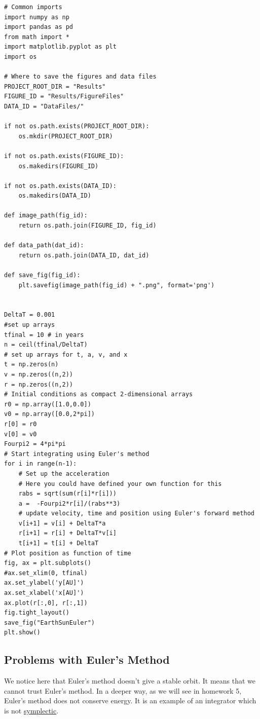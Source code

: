 \documentclass[%
oneside,                 %
final,                   %
10pt]{article}
\begin{document}
\begin{verbatim}
# Common imports
import numpy as np
import pandas as pd
from math import *
import matplotlib.pyplot as plt
import os

# Where to save the figures and data files
PROJECT_ROOT_DIR = "Results"
FIGURE_ID = "Results/FigureFiles"
DATA_ID = "DataFiles/"

if not os.path.exists(PROJECT_ROOT_DIR):
    os.mkdir(PROJECT_ROOT_DIR)

if not os.path.exists(FIGURE_ID):
    os.makedirs(FIGURE_ID)

if not os.path.exists(DATA_ID):
    os.makedirs(DATA_ID)

def image_path(fig_id):
    return os.path.join(FIGURE_ID, fig_id)

def data_path(dat_id):
    return os.path.join(DATA_ID, dat_id)

def save_fig(fig_id):
    plt.savefig(image_path(fig_id) + ".png", format='png')


DeltaT = 0.001
#set up arrays 
tfinal = 10 # in years
n = ceil(tfinal/DeltaT)
# set up arrays for t, a, v, and x
t = np.zeros(n)
v = np.zeros((n,2))
r = np.zeros((n,2))
# Initial conditions as compact 2-dimensional arrays
r0 = np.array([1.0,0.0])
v0 = np.array([0.0,2*pi])
r[0] = r0
v[0] = v0
Fourpi2 = 4*pi*pi
# Start integrating using Euler's method
for i in range(n-1):
    # Set up the acceleration
    # Here you could have defined your own function for this
    rabs = sqrt(sum(r[i]*r[i]))
    a =  -Fourpi2*r[i]/(rabs**3)
    # update velocity, time and position using Euler's forward method
    v[i+1] = v[i] + DeltaT*a
    r[i+1] = r[i] + DeltaT*v[i]
    t[i+1] = t[i] + DeltaT
# Plot position as function of time    
fig, ax = plt.subplots()
#ax.set_xlim(0, tfinal)
ax.set_ylabel('y[AU]')
ax.set_xlabel('x[AU]')
ax.plot(r[:,0], r[:,1])
fig.tight_layout()
save_fig("EarthSunEuler")
plt.show()

\end{verbatim}


\subsection*{Problems with Euler's Method}

We notice here that Euler's method doesn't give a stable orbit. It
means that we cannot trust Euler's method. In a deeper way, as we will
see in homework 5, Euler's method does not conserve energy. It is an
example of an integrator which is not
\href{{https://en.wikipedia.org/wiki/Symplectic_integrator}}{symplectic}.
\end{document}

